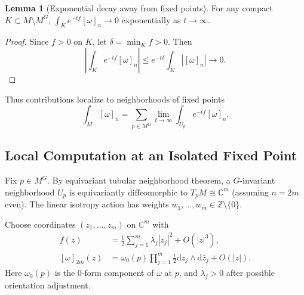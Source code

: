 \documentclass[10pt]{article}
\theoremstyle{definition}
\newtheorem{lemma}[definition]{Lemma}
\newcommand{\diff}{\mathrm{d}}
\newcommand{\C}{\mathbb{C}}
\newcommand{\Z}{\mathbb{Z}}
\begin{document}
\begin{lemma}[Exponential decay away from fixed points]
For any compact $K \subset M \setminus M^G$, $\int_K e^{-tf} [\omega]_n \to 0$ exponentially as $t \to \infty$.
\end{lemma}
\begin{proof}
Since $f > 0$ on $K$, let $\delta = \min_K f > 0$. Then
\begin{equation}
\left| \int_K e^{-tf} [\omega]_n \right| \leq e^{-t\delta} \int_K |[\omega]_n| \to 0.
\end{equation}
\end{proof}

Thus contributions localize to neighborhoods of fixed points
\begin{equation}\label{eq:sum-over-fixed}
    \int_{M} [\omega]_n = \sum_{p \in M^{G}} \lim_{t\to\infty} \int_{U_p} e^{-tf} [\omega]_n.
\end{equation}

\subsection{Local Computation at an Isolated Fixed Point}\label{subsec:local-computation}
Fix $p \in M^G$. By equivariant tubular neighborhood theorem, a $G$-invariant neighborhood $U_p$ is equivariantly diffeomorphic to $T_p M \cong \C^m$ (assuming $n=2m$ even). The linear isotropy action has weights $w_1, \dots, w_m \in \Z \setminus \{0\}$.

Choose coordinates $(z_1, \dots, z_m)$ on $\C^m$ with
\begin{align}
    f(z) &= \frac{1}{2} \sum_{j=1}^{m} \lambda_j |z_j|^2 + O(|z|^3), \label{eq:local-morse} \\
    [\omega]_{2m}(z) &= \omega_0(p) \prod_{j=1}^{m} \frac{i}{2} \diff z_j \wedge \diff\bar{z}_j + O(|z|). \label{eq:local-form}
\end{align}
Here $\omega_0(p)$ is the $0$-form component of $\omega$ at $p$, and $\lambda_j > 0$ after possible orientation adjustment.
\end{document}
